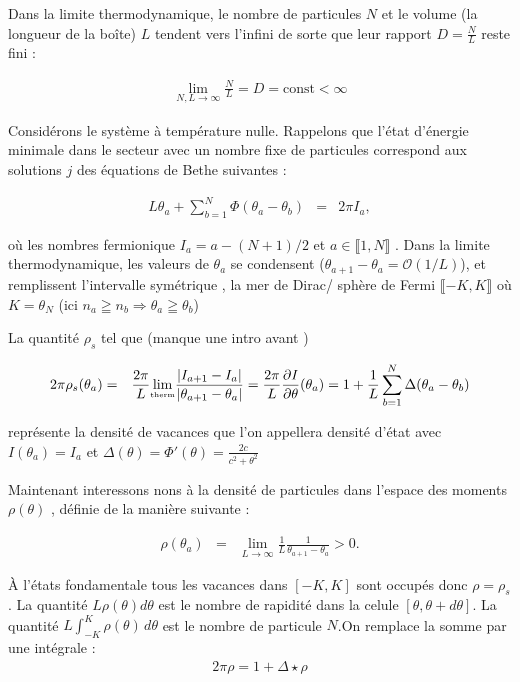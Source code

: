 Dans la limite thermodynamique, le nombre de particules \( N \) et le volume 
(la longueur de la boîte) \( L \) tendent vers l'infini de sorte que leur rapport 
\( D = \frac{N}{L} \) reste fini :

\begin{eqnarray*}
	\lim_{N, L \to \infty} \frac{N}{L} = D = \mbox{const} < \infty	
\end{eqnarray*}

Considérons le système à température nulle. Rappelons que l'état 
d'énergie minimale dans le secteur avec un nombre fixe de particules 
correspond aux solutions \( j \) des équations de Bethe suivantes :

\begin{eqnarray*}
	L \theta_a + \sum_{b = 1}^N \Phi ( \theta_a - \theta_b ) & = & 2\pi I_a ,	
\end{eqnarray*}

où les nombres fermionique $I_a = a - (N+1)/2$ et $a \in \llbracket 1 , N  \rrbracket$ . Dans la limite thermodynamique, les valeurs de \( \theta_a \) se condensent (\(\theta_{a+1} - \theta_a = \mathcal{O}(1/L)\)), et remplissent l'intervalle symétrique , la mer de Dirac/ sphère de Fermi  \(\llbracket-K, K\rrbracket\) où $K = \theta_N$ (ici $n_a \geqq n_b \Rightarrow \theta_a \geqq \theta_b$)

La quantité $\rho_s$ tel que (manque une intro avant ) 

\begin{eqnarray*}
	2\pi \rho_s (\theta_a) & = & \frac{2\pi}{L}\underset{\tiny \mbox{therm}}{\lim} \frac{ \vert I_{a+1} - I_{a} \vert}{ \vert \theta_{a+1} - \theta_a \vert} = \frac{2\pi}{L} \frac{ \partial I}{\partial \theta } ( \theta_a ) = 1 	+ \frac{1}{L}\sum_{b = 1}^N \Delta (\theta_a - \theta_b)
\end{eqnarray*}

représente la densité de vacances que l'on appellera densité d'état avec $I(\theta_a) = I_a$ et  $\Delta(\theta) = \Phi'(\theta)  = \frac{2c}{c^2 + \theta^2}$

Maintenant interessons nons à la densité de particules dans l'espace des moments \( \rho(\theta) \) , définie de la manière suivante :

\begin{eqnarray*}
	\rho(\theta_a)  &=  &\lim_{L \to \infty} \frac{1}{L} \frac{1}{\theta_{a+1} - \theta_a} > 0.	
\end{eqnarray*}

À l'états fondamentale tous les vacances dans $[-K , K ]$  sont occupés donc $\rho = \rho_s$. La quantité $L\rho(\theta)d\theta$ est le nombre de rapidité dans la celule $[ \theta , \theta + d \theta ] $. La quantité $L \int_{-K}^K \rho (\theta ) \, d\theta $ est le nombre de particule $N$.On remplace la somme par une intégrale :
\begin{eqnarray*}
	2\pi \rho  = 1 + \Delta \star \rho 	
\end{eqnarray*}



 


